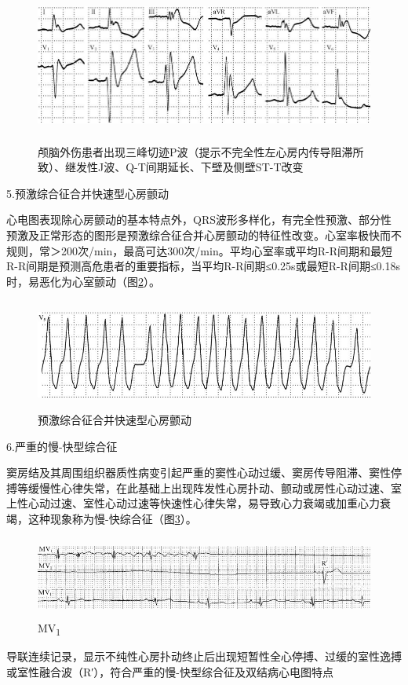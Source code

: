 \begin{figure}[!htbp]
 \centering
 \includegraphics[width=5.75in,height=2.01042in]{./images/Image00551.jpg}
 \captionsetup{justification=centering}
 \caption{颅脑外伤患者出现三峰切迹P波（提示不完全性左心房内传导阻滞所致）、继发性J波、Q-T间期延长、下壁及侧壁ST-T改变}
 \label{fig34-11}
  \end{figure} 

5.预激综合征合并快速型心房颤动

心电图表现除心房颤动的基本特点外，QRS波形多样化，有完全性预激、部分性预激及正常形态的图形是预激综合征合并心房颤动的特征性改变。心室率极快而不规则，常＞200次/min，最高可达300次/min。平均心室率或平均R-R间期和最短R-R间期是预测高危患者的重要指标，当平均R-R间期≤0.25s或最短R-R间期≤0.18s时，易恶化为心室颤动（图\ref{fig34-12}）。

\begin{figure}[!htbp]
 \centering
 \includegraphics[width=5.625in,height=1.4375in]{./images/Image00552.jpg}
 \captionsetup{justification=centering}
 \caption{预激综合征合并快速型心房颤动}
 \label{fig34-12}
  \end{figure} 

6.严重的慢-快型综合征

窦房结及其周围组织器质性病变引起严重的窦性心动过缓、窦房传导阻滞、窦性停搏等缓慢性心律失常，在此基础上出现阵发性心房扑动、颤动或房性心动过速、室上性心动过速、室性心动过速等快速性心律失常，易导致心力衰竭或加重心力衰竭，这种现象称为慢-快综合征（图\ref{fig34-13}）。

\begin{figure}[!htbp]
 \centering
 \includegraphics[width=5.58333in,height=1.05208in]{./images/Image00553.jpg}
 \captionsetup{justification=centering}
 \caption{MV\textsubscript{1}}
 \label{fig34-13}
  \end{figure} 
导联连续记录，显示不纯性心房扑动终止后出现短暂性全心停搏、过缓的室性逸搏或室性融合波（R′），符合严重的慢-快型综合征及双结病心电图特点


